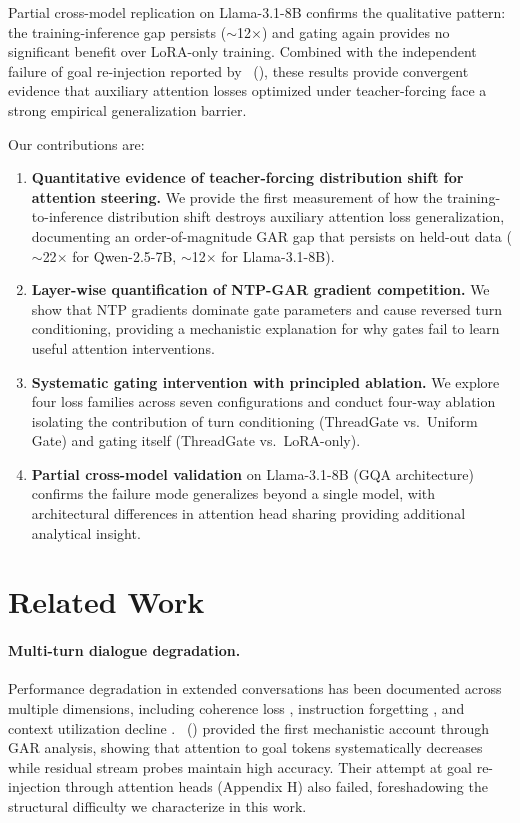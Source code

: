 \documentclass[11pt,a4paper]{article}
\newcommand{\citet}[1]{\citeauthor{#1}~(\citeyear{#1})}
\begin{document}
Partial cross-model replication on Llama-3.1-8B confirms the qualitative pattern: the training-inference gap persists ($\sim$12$\times$) and gating again provides no significant benefit over LoRA-only training. Combined with the independent failure of goal re-injection reported by \citet{dongre2026}, these results provide convergent evidence that auxiliary attention losses optimized under teacher-forcing face a strong empirical generalization barrier.

Our contributions are:
\begin{enumerate}
\item \textbf{Quantitative evidence of teacher-forcing distribution shift for attention steering.} We provide the first measurement of how the training-to-inference distribution shift destroys auxiliary attention loss generalization, documenting an order-of-magnitude GAR gap that persists on held-out data ($\sim$22$\times$ for Qwen-2.5-7B, $\sim$12$\times$ for Llama-3.1-8B).
\item \textbf{Layer-wise quantification of NTP-GAR gradient competition.} We show that NTP gradients dominate gate parameters and cause reversed turn conditioning, providing a mechanistic explanation for why gates fail to learn useful attention interventions.
\item \textbf{Systematic gating intervention with principled ablation.} We explore four loss families across seven configurations and conduct four-way ablation isolating the contribution of turn conditioning (ThreadGate vs.\ Uniform Gate) and gating itself (ThreadGate vs.\ LoRA-only).
\item \textbf{Partial cross-model validation} on Llama-3.1-8B (GQA architecture) confirms the failure mode generalizes beyond a single model, with architectural differences in attention head sharing providing additional analytical insight.
\end{enumerate}

\section{Related Work}

\paragraph{Multi-turn dialogue degradation.}
Performance degradation in extended conversations has been documented across multiple dimensions, including coherence loss \cite{zhang2024dialogueconsistency}, instruction forgetting \cite{chen2025instructionfollow}, and context utilization decline \cite{liu2024lost}. \citet{dongre2026} provided the first mechanistic account through GAR analysis, showing that attention to goal tokens systematically decreases while residual stream probes maintain high accuracy. Their attempt at goal re-injection through attention heads (Appendix H) also failed, foreshadowing the structural difficulty we characterize in this work.
\end{document}
